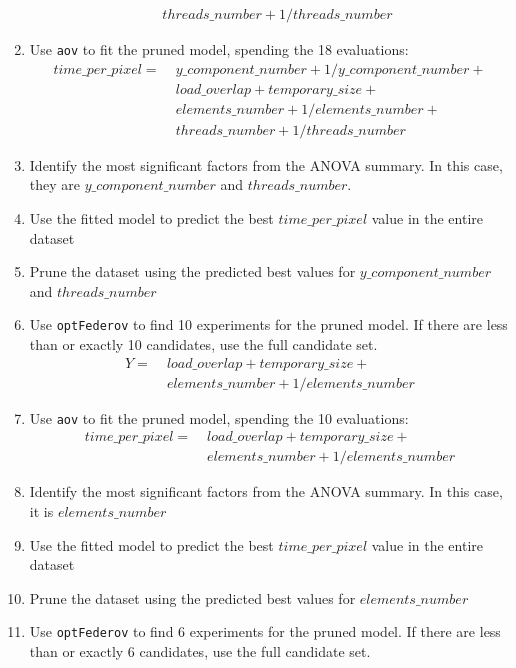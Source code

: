 \documentclass[final,12pt,a4paper]{article}
\begin{document}
\begin{enumerate}
\begin{align*}
        & \; threads\_number + 1 / threads\_number
\end{align*}
\item Use \texttt{aov} to fit the pruned model, spending the 18 evaluations:
\begin{align*}
      time\_per\_pixel = & \; y\_component\_number + 1 / y\_component\_number + \\
                        & \; load\_overlap + temporary\_size + \\
                        & \; elements\_number + 1 / elements\_number + \\
                        & \; threads\_number + 1 / threads\_number
\end{align*}
\item Identify the most significant factors from the ANOVA summary. In this
case, they are \(y\_component\_number\) and \(threads\_number\).
\item Use the fitted model to predict the best \(time\_per\_pixel\) value in the
entire dataset
\item Prune the dataset using the predicted best values for \(y\_component\_number\) and
\(threads\_number\)
\item Use \texttt{optFederov} to find 10 experiments for the pruned model. If there are less
than or exactly 10 candidates, use the full candidate set.
\begin{align*}
    Y = & \; load\_overlap + temporary\_size + \\
        & \; elements\_number + 1 / elements\_number
\end{align*}
\item Use \texttt{aov} to fit the pruned model, spending the 10 evaluations:
\begin{align*}
      time\_per\_pixel = & \; load\_overlap + temporary\_size + \\
                        & \; elements\_number + 1 / elements\_number
\end{align*}
\item Identify the most significant factors from the ANOVA summary. In this
case, it is \(elements\_number\)
\item Use the fitted model to predict the best \(time\_per\_pixel\) value in the
entire dataset
\item Prune the dataset using the predicted best values for \(elements\_number\)
\item Use \texttt{optFederov} to find 6 experiments for the pruned model. If there are less
than or exactly 6 candidates, use the full candidate set.

\end{enumerate}
\end{document}
